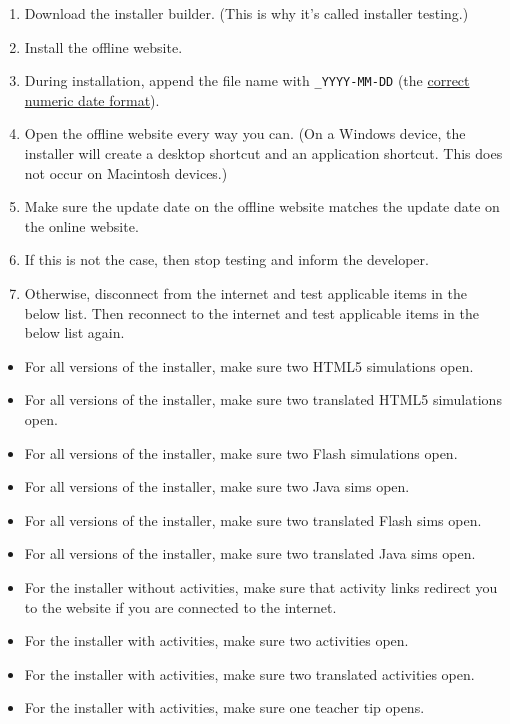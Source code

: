 \documentclass[titlepage]{article}
\begin{document}
		\begin{enumerate}
			\item Download the installer builder. (This is why it's called installer testing.)
			\item Install the offline website.
			\item During installation, append the file name with \verb|_YYYY-MM-DD| (the \href{https://xkcd.com/1179/}{correct numeric date format}).
			\item Open the offline website every way you can. (On a Windows device, the installer will create a desktop shortcut and an application shortcut. This does not occur on Macintosh devices.)
			\item Make sure the update date on the offline website matches the update date on the online website.
			\item If this is not the case, then stop testing and inform the developer.
			\item Otherwise, disconnect from the internet and test applicable items in the below list. Then reconnect to the internet and test applicable items in the below list again.
		\end{enumerate}
		
		\begin{itemize}
			\item For all versions of the installer, make sure two HTML5 simulations open.
			\item For all versions of the installer, make sure two translated HTML5 simulations open.
			\item For all versions of the installer, make sure two Flash simulations open.
			\item For all versions of the installer, make sure two Java sims open.
			\item For all versions of the installer, make sure two translated Flash sims open.
			\item For all versions of the installer, make sure two translated Java sims open.
			\item For the installer without activities, make sure that activity links redirect you to the website if you are connected to the internet.
			\item For the installer with activities, make sure two activities open.
			\item For the installer with activities, make sure two translated activities open.
			\item For the installer with activities, make sure one teacher tip opens.
		\end{itemize}
\end{document}
